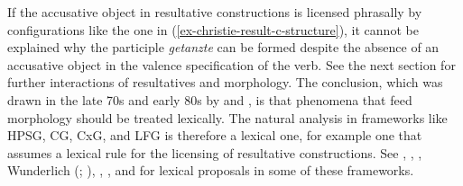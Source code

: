 If the accusative object in resultative constructions is licensed phrasally by
configurations like the one in (\ref{ex-christie-result-c-structure}), it cannot be explained why the participle \emph{getanzte}
can be formed despite the absence of an accusative object in the valence specification of the
verb. See the next section for further interactions of resultatives and morphology.
The conclusion, which was drawn in the late 70s and early 80s by \citet[]{Dowty78a}
and \citet[]{Bresnan82a}, is that phenomena that feed morphology should be treated
lexically. The natural analysis in frameworks like HPSG, CG, CxG, and LFG is therefore a lexical
one, for example one that assumes a lexical rule for the licensing of resultative constructions. See
, , , Wunderlich (\citeyear[]{Wunderlich92a-u-kopiert}; \citeyear[--126]{Wunderlich97c}), ,
 , 
 and  for lexical proposals in some of  these frameworks. 




